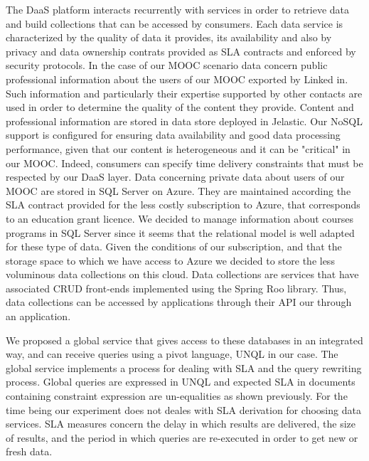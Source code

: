 The DaaS platform interacts recurrently with services in order to retrieve data and build collections that can be accessed by consumers. Each data service is characterized by the quality of data it provides, its availability and also by privacy and data ownership contrats provided as SLA contracts and enforced by security protocols. In the case of our MOOC scenario data concern public professional information about the users of our MOOC exported by Linked in. Such information and particularly their expertise supported by other contacts are used in order to determine the quality of the content they provide. Content and professional information are stored in data store deployed in Jelastic.  Our NoSQL support is configured for ensuring data availability and good data processing performance, given that our content is heterogeneous and it can be "critical" in our MOOC. Indeed, consumers can specify time delivery constraints that must be respected by our DaaS layer. Data concerning private data about users of our MOOC are stored in SQL Server on Azure. They are maintained according the  SLA contract provided for the less costly subscription to Azure, that corresponds to an education grant licence. We decided to manage information about courses programs in SQL Server since it seems that the relational model is well adapted for these type of data. Given the conditions of our subscription, and that the storage space to which we have access to Azure we decided to store the less voluminous data collections on this cloud. Data collections are services that have associated CRUD front-ends implemented using the Spring Roo library. Thus, data collections can be accessed by applications through their API our through an application. 

We proposed a global service that gives access to these databases in an integrated way, and can receive queries using a pivot language, UNQL in our case. The global service implements a  process for dealing with SLA and  the  query rewriting process. Global queries are expressed in UNQL and expected SLA in documents containing constraint expression are un-equalities as shown previously. For the time being our experiment does not deales with SLA derivation for choosing data services. SLA measures concern the delay in which results are delivered, the size of results, and the period in which queries are re-executed in order to get new or fresh data.
